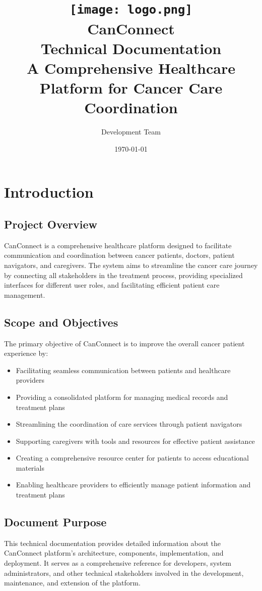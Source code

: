 \documentclass[12pt,a4paper]{report}
\title{
    \vspace{-1cm}
    \texttt{[image: logo.png]}\\
    \Huge\textbf{CanConnect}\\
    \Large Technical Documentation\\
    \vspace{0.5cm}
    \large A Comprehensive Healthcare Platform for Cancer Care Coordination
}
\author{Development Team}
\date{\today}
\begin{document}
\maketitle
\tableofcontents
\newpage

\chapter{Introduction}

\section{Project Overview}
CanConnect is a comprehensive healthcare platform designed to facilitate communication and coordination between cancer patients, doctors, patient navigators, and caregivers. The system aims to streamline the cancer care journey by connecting all stakeholders in the treatment process, providing specialized interfaces for different user roles, and facilitating efficient patient care management.

\section{Scope and Objectives}
The primary objective of CanConnect is to improve the overall cancer patient experience by:
\begin{itemize}
    \item Facilitating seamless communication between patients and healthcare providers
    \item Providing a consolidated platform for managing medical records and treatment plans
    \item Streamlining the coordination of care services through patient navigators
    \item Supporting caregivers with tools and resources for effective patient assistance
    \item Creating a comprehensive resource center for patients to access educational materials
    \item Enabling healthcare providers to efficiently manage patient information and treatment plans
\end{itemize}

\section{Document Purpose}
This technical documentation provides detailed information about the CanConnect platform's architecture, components, implementation, and deployment. It serves as a comprehensive reference for developers, system administrators, and other technical stakeholders involved in the development, maintenance, and extension of the platform.
\end{document}
